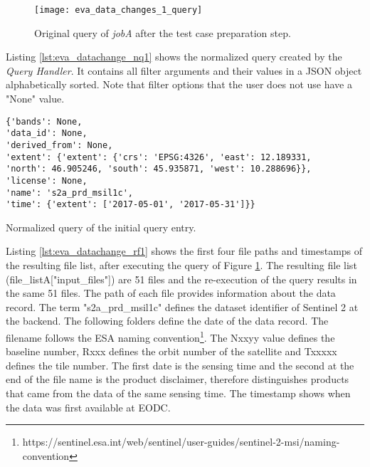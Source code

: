 \documentclass[draft,final]{vutinfth} %
\newenvironment{code}{\captionsetup{type=listing}}{}
\begin{document}
\begin{enumerate}
	\begin{figure}[h]
		\centering
		\texttt{[image: eva\_data\_changes\_1\_query]}
		\caption{Original query of \textit{jobA} after the test case preparation step.}
		\label{fig:eva_data_changes_1_query} %
	\end{figure}
	
	Listing \ref{lst:eva_datachange_nq1} shows the normalized query created by the \textit{Query Handler}. It contains all filter arguments and their values in a JSON object alphabetically sorted. Note that filter options that the user does not use have a "None" value.
	
	\begin{code}
		\begin{verbatim}
{'bands': None, 
'data_id': None, 
'derived_from': None, 
'extent': {'extent': {'crs': 'EPSG:4326', 'east': 12.189331, 
'north': 46.905246, 'south': 45.935871, 'west': 10.288696}}, 
'license': None, 
'name': 's2a_prd_msil1c', 
'time': {'extent': ['2017-05-01', '2017-05-31']}}
		\end{verbatim}
		\caption{Normalized query of the initial query entry.}
		\label{lst:eva_datachange_nq1}
	\end{code}
	
	Listing \ref{lst:eva_datachange_rf1} shows the first four file paths and timestamps of the resulting file list, after executing the query of Figure \ref{fig:eva_data_changes_1_query}. The resulting file list (file\_listA["input\_files"]) are 51 files and the re-execution of the query results in the same 51 files. The path of each file provides information about the data record. The term "s2a\_prd\_msil1c" defines the dataset identifier of Sentinel 2 at the backend. The following folders define the date of the data record. The filename follows the ESA naming convention\footnote{https://sentinel.esa.int/web/sentinel/user-guides/sentinel-2-msi/naming-convention}. The Nxxyy value defines the baseline number, Rxxx defines the orbit number of the satellite and Txxxxx defines the tile number. The first date is the sensing time and the second at the end of the file name is the product disclaimer, therefore distinguishes products that came from the data of the same sensing time. The timestamp shows when the data was first available at EODC.
	

\end{enumerate}
\end{document}
